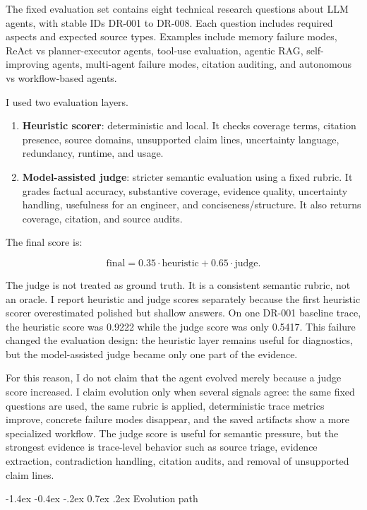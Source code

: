 \documentclass[10pt]{article}
\makeatletter
\renewcommand\subsection{\@startsection{subsection}{2}{\z@}%
  {-1.4ex \@plus -0.4ex \@minus -.2ex}%
  {0.7ex \@plus .2ex}%
  {\normalfont\normalsize\bfseries}}
\makeatother
\begin{document}
The fixed evaluation set contains eight technical research questions about LLM agents, with stable IDs DR-001 to DR-008. Each question includes required aspects and expected source types. Examples include memory failure modes, ReAct vs planner-executor agents, tool-use evaluation, agentic RAG, self-improving agents, multi-agent failure modes, citation auditing, and autonomous vs workflow-based agents.

I used two evaluation layers.

\begin{enumerate}
    \item \textbf{Heuristic scorer}: deterministic and local. It checks coverage terms, citation presence, source domains, unsupported claim lines, uncertainty language, redundancy, runtime, and usage.
    \item \textbf{Model-assisted judge}: stricter semantic evaluation using a fixed rubric. It grades factual accuracy, substantive coverage, evidence quality, uncertainty handling, usefulness for an engineer, and conciseness/structure. It also returns coverage, citation, and source audits.
\end{enumerate}

The final score is:

\[
\text{final} = 0.35 \cdot \text{heuristic} + 0.65 \cdot \text{judge}.
\]

The judge is not treated as ground truth. It is a consistent semantic rubric, not an oracle. I report heuristic and judge scores separately because the first heuristic scorer overestimated polished but shallow answers. On one DR-001 baseline trace, the heuristic score was 0.9222 while the judge score was only 0.5417. This failure changed the evaluation design: the heuristic layer remains useful for diagnostics, but the model-assisted judge became only one part of the evidence.

For this reason, I do not claim that the agent evolved merely because a judge score increased. I claim evolution only when several signals agree: the same fixed questions are used, the same rubric is applied, deterministic trace metrics improve, concrete failure modes disappear, and the saved artifacts show a more specialized workflow. The judge score is useful for semantic pressure, but the strongest evidence is trace-level behavior such as source triage, evidence extraction, contradiction handling, citation audits, and removal of unsupported claim lines.

\subsection{Evolution path}
\end{document}
